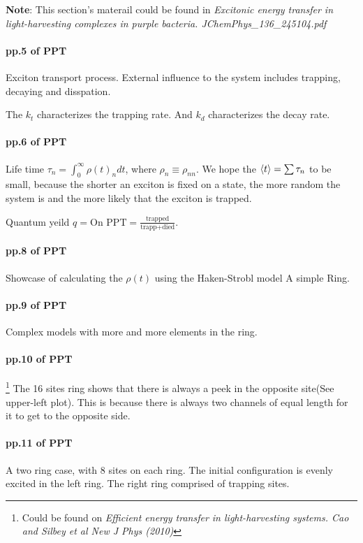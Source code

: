 \documentclass{article}
\numberwithin{equation}{subsection} %
\theoremstyle{definition}
\begin{document}
\textbf{Note}: This section's materail could be found in
\textit{Excitonic energy transfer in light-harvesting complexes 
in purple bacteria. JChemPhys\_136\_245104.pdf}

\paragraph{pp.5 of PPT}
Exciton transport process. External
influence to the system includes trapping, decaying and disspation.

The $k_t$ characterizes the trapping rate. And $k_d$ characterizes
the decay rate.

\paragraph{pp.6 of PPT}
Life time $\tau_n = \int_0^\infty \rho(t)_n dt$, where
$\rho_n \equiv \rho_{nn}$. We hope the $\braket{t} = \sum \tau_n$
to be small, because the shorter an exciton is fixed on a state,
the more random the system is and the more likely that the exciton
is trapped.

Quantum yeild $q= \text{On PPT} 
            = \frac{\text{trapped}}{\text{trapp} + \text{died}}$.

\paragraph{pp.8 of PPT}
Showcase of calculating the $\rho(t)$ using the Haken-Strobl model
A simple Ring.

\paragraph{pp.9 of PPT}
Complex models with more and more elements in the ring. 

\paragraph{pp.10 of PPT}
\footnote{Could be found on \textit{Efficient energy transfer in 
light-harvesting systems. Cao and Silbey et al New J Phys (2010)}}
The 16 sites ring shows that there is always 
a peek in the opposite site(See upper-left plot). This is
because there is always
two channels of equal length for it to get to the opposite side.

\paragraph{pp.11 of PPT}
A two ring case, with 8 sites on each ring. The initial configuration
is evenly excited in the left ring. The right ring comprised of
trapping sites.
\end{document}

